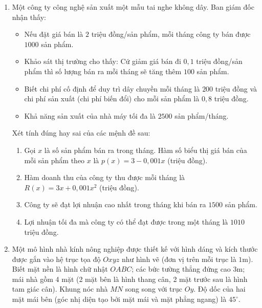 \documentclass[12pt]{article}
\begin{document}
	\begin{enumerate}[label=\textbf{Câu \arabic*.}, leftmargin=*]
		
		\item Một công ty công nghệ sản xuất một mẫu tai nghe không dây. Ban giám đốc nhận thấy:
		\begin{itemize}
			\item Nếu đặt giá bán là $2$ triệu đồng/sản phẩm, mỗi tháng công ty bán được $1000$ sản phẩm.
			\item Khảo sát thị trường cho thấy: Cứ giảm giá bán đi $0,1$ triệu đồng/sản phẩm thì số lượng bán ra mỗi tháng sẽ tăng thêm $100$ sản phẩm.
			\item Biết chi phí cố định để duy trì dây chuyền mỗi tháng là $200$ triệu đồng và chi phí sản xuất (chi phí biến đổi) cho mỗi sản phẩm là $0,8$ triệu đồng.
			\item Khả năng sản xuất của nhà máy tối đa là $2500$ sản phẩm/tháng.
		\end{itemize}
		Xét tính đúng hay sai của các mệnh đề sau:
		\begin{enumerate}[label=\alph*)]
			\item Gọi $x$ là số sản phẩm bán ra trong tháng. Hàm số biểu thị giá bán của mỗi sản phẩm theo $x$ là $p(x) = 3 - 0,001x$ (triệu đồng).
			\item Hàm doanh thu của công ty thu được mỗi tháng là $R(x) = 3x + 0,001x^2$ (triệu đồng).
			\item Công ty sẽ đạt lợi nhuận cao nhất trong tháng khi bán ra $1500$ sản phẩm.
			\item Lợi nhuận tối đa mà công ty có thể đạt được trong một tháng là $1010$ triệu đồng.
		\end{enumerate}
		
		\vspace{4mm}
		\item Một mô hình nhà kính nông nghiệp được thiết kế với hình dáng và kích thước được gắn vào hệ trục tọa độ $Oxyz$ như hình vẽ (đơn vị trên mỗi trục là $1$m). 
		Biết mặt nền là hình chữ nhật $OABC$; các bức tường thẳng đứng cao $3$m; mái nhà gồm 4 mặt (2 mặt bên là hình thang cân, 2 mặt trước sau là hình tam giác cân). Khung nóc nhà $MN$ song song với trục $Oy$. Độ dốc của hai mặt mái bên (góc nhị diện tạo bởi mặt mái và mặt phẳng ngang) là $45^\circ$.
		

\end{enumerate}
\end{document}

